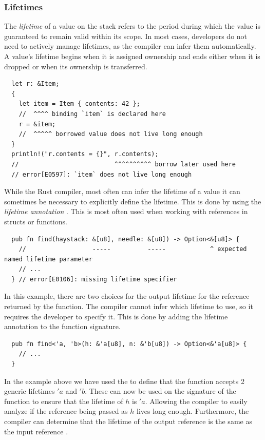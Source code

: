 \documentclass[11pt]{report}
\theoremstyle{definition}
\theoremstyle{plain}
\begin{document}
\subsubsection{Lifetimes}
The \textit{lifetime} of a value on the stack refers to the period during which the value is guaranteed to remain valid within its scope. In most cases, developers do not need to actively manage lifetimes, as the compiler can infer them automatically. A value's lifetime begins when it is assigned ownership and ends either when it is dropped or when its ownership is transferred.
\begin{verbatim}
  let r: &Item;
  {
    let item = Item { contents: 42 };
    //  ^^^^ binding `item` is declared here
    r = &item;
    //  ^^^^^ borrowed value does not live long enough
  }
  println!("r.contents = {}", r.contents);
  //                          ^^^^^^^^^^ borrow later used here
  // error[E0597]: `item` does not live long enough
\end{verbatim}
While the Rust compiler, most often can infer the lifetime of a value it can sometimes be necessary to explicitly define the lifetime. This is done by using the \textit{lifetime annotation} . This is most often used when working with references in structs or functions.
\begin{verbatim}
  pub fn find(haystack: &[u8], needle: &[u8]) -> Option<&[u8]> {
    //                  -----          -----            ^ expected named lifetime parameter
    // ...
  } // error[E0106]: missing lifetime specifier
\end{verbatim}
In this example, there are two choices for the output lifetime for the reference returned by the function. The compiler cannot infer which lifetime to use, so it requires the developer to specify it. This is done by adding the lifetime annotation to the function signature.
\begin{verbatim}
  pub fn find<'a, 'b>(h: &'a[u8], n: &'b[u8]) -> Option<&'a[u8]> {
    // ...
  }
\end{verbatim}
In the example above we have used the  to define that the function accepts 2 generic lifetimes $'a$ and $'b$. These can now be used on the signature of the function to ensure that the lifetime of $h$ is $'a$. Allowing the compiler to easily analyze if the reference being passed as $h$ lives long enough.
Furthermore, the compiler can determine that the lifetime of the output reference is the same as the input reference .
\end{document}
